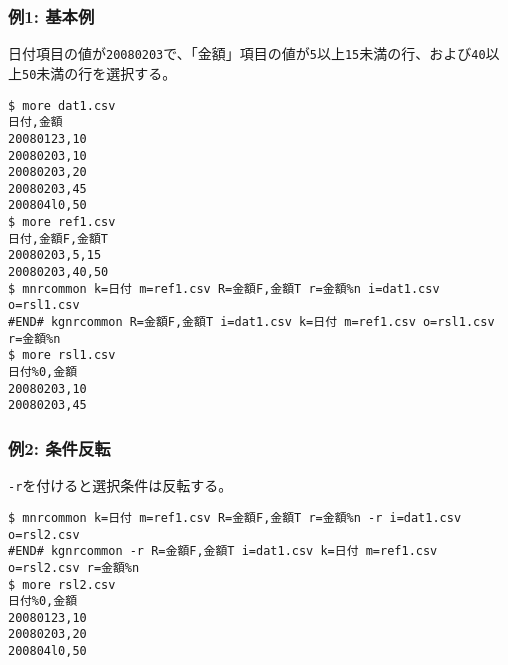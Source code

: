 \subsubsection*{例1: 基本例}

日付項目の値が\verb|20080203|で、「金額」項目の値が\verb|5|以上\verb|15|未満の行、および\verb|40|以上\verb|50|未満の行を選択する。


\begin{Verbatim}[baselinestretch=0.7,frame=single]
$ more dat1.csv
日付,金額
20080123,10
20080203,10
20080203,20
20080203,45
200804l0,50
$ more ref1.csv
日付,金額F,金額T
20080203,5,15
20080203,40,50
$ mnrcommon k=日付 m=ref1.csv R=金額F,金額T r=金額%n i=dat1.csv o=rsl1.csv
#END# kgnrcommon R=金額F,金額T i=dat1.csv k=日付 m=ref1.csv o=rsl1.csv r=金額%n
$ more rsl1.csv
日付%0,金額
20080203,10
20080203,45
\end{Verbatim}
\subsubsection*{例2: 条件反転}

\verb|-r|を付けると選択条件は反転する。


\begin{Verbatim}[baselinestretch=0.7,frame=single]
$ mnrcommon k=日付 m=ref1.csv R=金額F,金額T r=金額%n -r i=dat1.csv o=rsl2.csv
#END# kgnrcommon -r R=金額F,金額T i=dat1.csv k=日付 m=ref1.csv o=rsl2.csv r=金額%n
$ more rsl2.csv
日付%0,金額
20080123,10
20080203,20
200804l0,50
\end{Verbatim}
